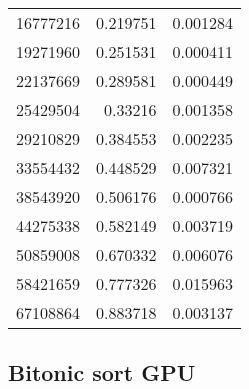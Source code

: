 \begin{longtable}{r r r}
16777216 & 0.219751 & 0.001284 \\
19271960 & 0.251531 & 0.000411 \\
22137669 & 0.289581 & 0.000449 \\
25429504 & 0.33216 & 0.001358 \\
29210829 & 0.384553 & 0.002235 \\
33554432 & 0.448529 & 0.007321 \\
38543920 & 0.506176 & 0.000766 \\
44275338 & 0.582149 & 0.003719 \\
50859008 & 0.670332 & 0.006076 \\
58421659 & 0.777326 & 0.015963 \\
67108864 & 0.883718 & 0.003137 \\
\end{longtable}

\subsection*{Bitonic sort GPU}

